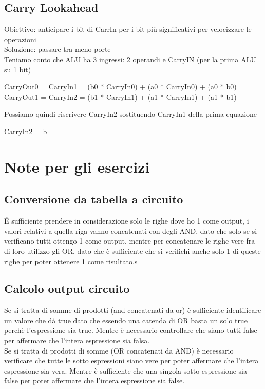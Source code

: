 \documentclass[12pt, a4paper, openany]{book}
\begin{document}
\subsection{Carry Lookahead}
Obiettivo: anticipare i bit di CarrIn per i bit più significativi per velocizzare le operazioni
\\ Soluzione: passare tra meno porte
\\ Teniamo conto che ALU ha 3 ingressi: 2 operandi e CarryIN (per la prima ALU su 1 bit)
\begin{center}
    CarryOut0 = CarryIn1 = (b0 * CarryIn0) + (a0 * CarryIn0) + (a0 * b0)
    \\CarryOut1 = CarryIn2 = (b1 * CarryIn1) + (a1 * CarryIn1) + (a1 * b1)
\end{center}
Possiamo quindi riscrivere CarryIn2 sostituendo CarryIn1 della prima equazione
\begin{center}
    CarryIn2 = b
\end{center}

\section{Note per gli esercizi}
\subsection{Conversione da tabella a circuito}
\'E sufficiente prendere in considerazione solo le righe dove ho 1 come output, i valori 
relativi a quella riga vanno concatenati con degli AND, dato che solo se si verificano tutti
ottengo 1 come output, mentre per concatenare le righe vere fra di loro utilizzo gli OR, dato che
è sufficiente che si verifichi anche solo 1 di queste righe per poter ottenere 1 come risultato.s
\subsection{Calcolo output circuito}
Se si tratta di somme di prodotti (and concatenati da or) è sufficiente identificare un valore
che dà true dato che essendo una catenda di OR basta un solo true perchè l'espressione sia true.
Mentre è necessario controllare che siano tutti false per affermare che l'intera espressione
sia falsa.
\\Se si tratta di prodotti di somme (OR concatenati da AND) è necessario verificare che tutte le
sotto espressioni siano vere per poter affermare che l'intera espressione sia vera.
Mentre è sufficiente che una singola sotto espressione sia false per poter affermare che
l'intera espressione sia false.
\end{document}

